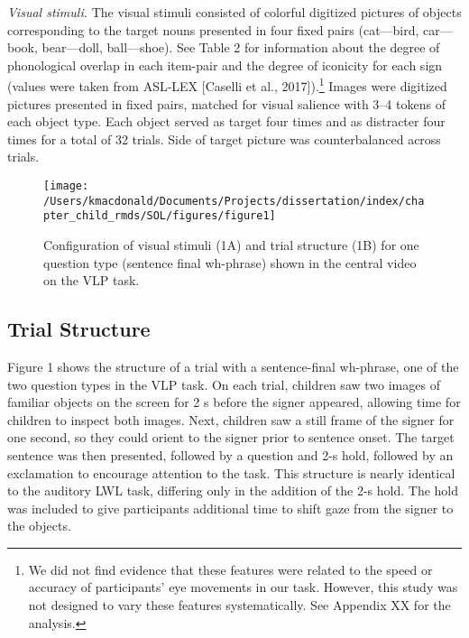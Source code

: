 \documentclass[oneside]{report}
\begin{document}
\emph{Visual stimuli.} The visual stimuli consisted of colorful
digitized pictures of objects corresponding to the target nouns
presented in four fixed pairs (cat---bird, car---book, bear---doll,
ball---shoe). See Table 2 for information about the degree of
phonological overlap in each item-pair and the degree of iconicity for
each sign (values were taken from ASL-LEX {[}Caselli et al.,
2017{]}).\footnote{We did not find evidence that these features were
  related to the speed or accuracy of participants' eye movements in our
  task. However, this study was not designed to vary these features
  systematically. See Appendix XX for the analysis.} Images were
digitized pictures presented in fixed pairs, matched for visual salience
with 3--4 tokens of each object type. Each object served as target four
times and as distracter four times for a total of 32 trials. Side of
target picture was counterbalanced across trials.
\begin{figure}[t]

{\centering \texttt{[image: /Users/kmacdonald/Documents/Projects/dissertation/index/chapter\_child\_rmds/SOL/figures/figure1]} 

}

\caption[Stimuli in the Visual Language Processing Task]{Configuration of visual stimuli (1A) and trial structure (1B) for one question type (sentence final wh-phrase) shown in the central video on the VLP task.}\label{fig:sol-trial-fig}
\end{figure}
\hypertarget{trial-structure}{%
\subsection{Trial Structure}\label{trial-structure}}

Figure 1 shows the structure of a trial with a sentence-final wh-phrase,
one of the two question types in the VLP task. On each trial, children
saw two images of familiar objects on the screen for 2 s before the
signer appeared, allowing time for children to inspect both images.
Next, children saw a still frame of the signer for one second, so they
could orient to the signer prior to sentence onset. The target sentence
was then presented, followed by a question and 2-s hold, followed by an
exclamation to encourage attention to the task. This structure is nearly
identical to the auditory LWL task, differing only in the addition of
the 2-s hold. The hold was included to give participants additional time
to shift gaze from the signer to the objects.
\end{document}
